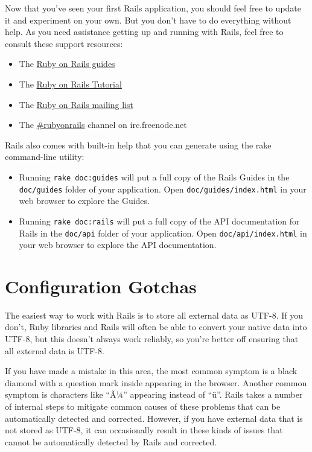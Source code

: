 \documentclass[10pt]{book}
\begin{document}
Now that you’ve seen your first Rails application, you should feel free to update it and experiment on your own. But you don’t have to do everything without help. As you need assistance getting up and running with Rails, feel free to consult these support resources:
\begin{itemize}
	\item The \href{http://guides.rubyonrails.org/index.html}{Ruby on Rails guides}
	\item The \href{http://railstutorial.org/book}{Ruby on Rails Tutorial}
	\item The \href{http://groups.google.com/group/rubyonrails-talk}{Ruby on Rails mailing list}
	\item The \href{irc://irc.freenode.net/#rubyonrails}{\#rubyonrails} channel on irc.freenode.net
\end{itemize}

Rails also comes with built-in help that you can generate using the rake command-line utility:
\begin{itemize}
	\item Running \texttt{rake doc:guides} will put a full copy of the Rails Guides in the \texttt{doc/guides} folder of your application. Open \texttt{doc/guides/index.html} in your web browser to explore the Guides.
	\item Running \texttt{rake doc:rails} will put a full copy of the API documentation for Rails in the \texttt{doc/api} folder of your application. Open \texttt{doc/api/index.html} in your web browser to explore the API documentation.
\end{itemize}

\section{ Configuration Gotchas}

The easiest way to work with Rails is to store all external data as UTF-8. If you don’t, Ruby libraries and Rails will often be able to convert your native data into UTF-8, but this doesn’t always work reliably, so you’re better off ensuring that all external data is UTF-8.

If you have made a mistake in this area, the most common symptom is a black diamond with a question mark inside appearing in the browser. Another common symptom is characters like “Ã¼” appearing instead of “ü”. Rails takes a number of internal steps to mitigate common causes of these problems that can be automatically detected and corrected. However, if you have external data that is not stored as UTF-8, it can occasionally result in these kinds of issues that cannot be automatically detected by Rails and corrected.
\end{document}
